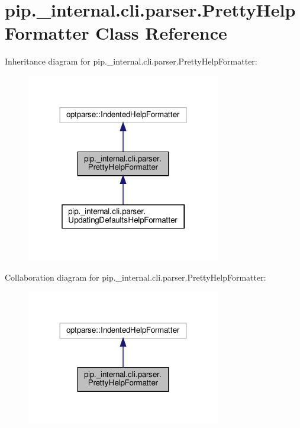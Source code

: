 \hypertarget{classpip_1_1__internal_1_1cli_1_1parser_1_1PrettyHelpFormatter}{}\section{pip.\+\_\+internal.\+cli.\+parser.\+Pretty\+Help\+Formatter Class Reference}
\label{classpip_1_1__internal_1_1cli_1_1parser_1_1PrettyHelpFormatter}


Inheritance diagram for pip.\+\_\+internal.\+cli.\+parser.\+Pretty\+Help\+Formatter\+:
\nopagebreak
\begin{figure}[H]
\begin{center}
\leavevmode
\includegraphics[width=240pt]{classpip_1_1__internal_1_1cli_1_1parser_1_1PrettyHelpFormatter__inherit__graph}
\end{center}
\end{figure}


Collaboration diagram for pip.\+\_\+internal.\+cli.\+parser.\+Pretty\+Help\+Formatter\+:
\nopagebreak
\begin{figure}[H]
\begin{center}
\leavevmode
\includegraphics[width=240pt]{classpip_1_1__internal_1_1cli_1_1parser_1_1PrettyHelpFormatter__coll__graph}
\end{center}
\end{figure}
